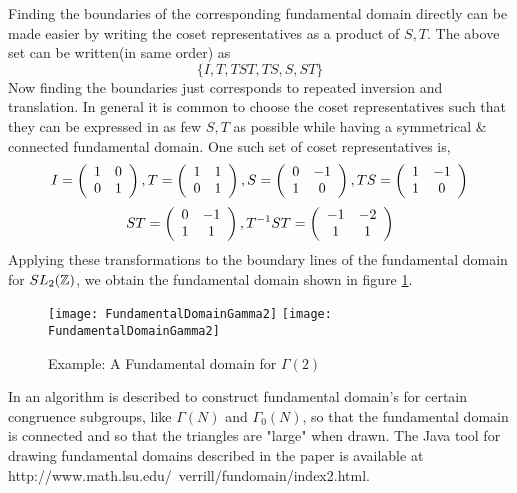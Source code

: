\begin{example}
Finding the boundaries of the corresponding fundamental domain directly can be made easier by writing the coset representatives as a product of $S,T$. The above set can be written(in same order) as 
$$  \{I, T, TST, TS, S, ST\}$$
Now finding the boundaries just corresponds to repeated inversion and translation. In general it is common to choose the coset representatives such that they can be expressed in as few $S,T$ as possible while having a symmetrical \& connected fundamental domain. One such set of coset representatives is, 
$$I = \left(\begin{array}{ c c }  1 & 0 \\ 0 & 1 \end{array} \right), T =  \left(\begin{array}{ c c }  1 & 1 \\ 0 & 1 \end{array} \right), S = \left(\begin{array}{ c c }  0 & -1 \\ 1 & 0 \end{array} \right), TS = \left(\begin{array}{ c c }  1 & -1 \\ 1 & 0 \end{array} \right)$$
$$ ST = \left(\begin{array}{ c c }  0 & -1 \\ 1 & 1 \end{array} \right), T^{-1}ST = \left(\begin{array}{ c c }  -1 & -2 \\ 1 & 1 \end{array} \right)$$
Applying these transformations to the boundary lines of the fundamental domain for $SL_2(\mathbb{Z})$, we obtain the fundamental domain shown in figure \ref{fig:funDomainGammaTwo}.
\begin{figure}[!htbp]
  \begin{center}
    \leavevmode
    \ifpdf
      \texttt{[image: FundamentalDomainGamma2]}
    \else
      \texttt{[image: FundamentalDomainGamma2]}
    \fi
    \caption{Example: A Fundamental domain for $\Gamma(2)$}
    \label{fig:funDomainGammaTwo}
  \end{center}
\end{figure}


\end{example}

\begin{remark}
In \citep{verrill} an algorithm is described to construct fundamental domain's for certain congruence subgroups, like $\Gamma(N)$ and $\Gamma_0(N)$, so that the fundamental domain is connected and so that the triangles are "large" when drawn. The Java tool for drawing fundamental domains described in the paper is available at  http://www.math.lsu.edu/~verrill/fundomain/index2.html.
\end{remark}










